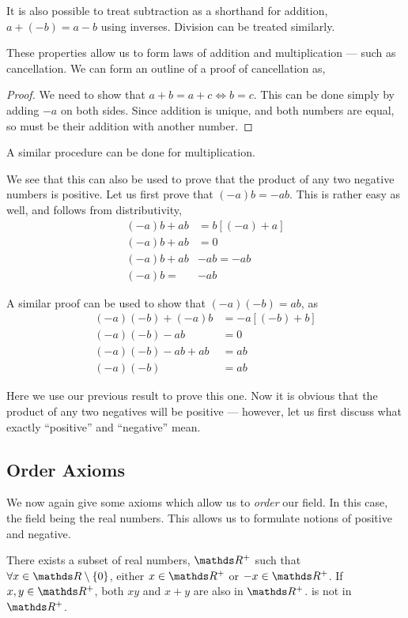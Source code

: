 It is also possible to treat subtraction as a shorthand for addition, \(a + (-b) = a - b\) using 
inverses. Division can be treated similarly.

These properties allow us to form laws of addition and multiplication --- such as 
cancellation. We can form an outline of a proof of cancellation as, 

\begin{proof}
    We need to show that \(a + b = a + c \iff b = c\). 
    This can be done simply by adding \(-a\) on both sides. Since addition is unique, 
    and both numbers are equal, so must be their addition with another number. 
\end{proof}

A similar procedure can be done for multiplication.

We see that this can also be used to prove that the product of any two negative numbers is 
positive. Let us first prove that \((-a)b = -ab\). This is rather easy as well, and follows 
from distributivity,
\begin{align*}
    (-a)b + ab &= b[(-a) + a] \\
    (-a)b + ab &= 0 \\
    (-a)b + ab &- ab = -ab\\
    (-a)b = &-ab
\end{align*}

A similar proof can be used to show that \((-a)(-b) = ab\), as 
\begin{align*}
    (-a)(-b) + (-a)b &= -a[(-b) + b] \\
    (-a)(-b) - ab &= 0\\
    (-a)(-b) - ab + ab &= ab\\
    (-a)(-b) &= ab
\end{align*}

Here we use our previous result to prove this one. Now it is obvious that the product of 
any two negatives will be positive --- however, let us first discuss what exactly ``positive''
and ``negative'' mean.

\subsection{Order Axioms}

We now again give some axioms which allow us to \emph{order} our field. 
In this case, the field being the real numbers. This allows us to formulate notions 
of positive and negative. 

\begin{axioms}
    \ii There exists a subset of real numbers, \(\RR^+\) such that \(\forall x \in \RR \setminus \Set{0}\),
     either \(x \in \RR^+\) or \(-x \in \RR^+\).
    \ii If \(x, y \in \RR^+\), both \(xy\) and \(x + y\) are also in \(\RR^+\).
     is not in \(\RR^+\).
\end{axioms}

